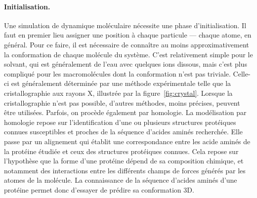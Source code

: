 	\paragraph{Initialisation.}
	Une simulation de dynamique moléculaire nécessite une phase d'initialisation. Il faut en premier lieu assigner une position à chaque particule --- chaque atome, en général. Pour ce faire, il est nécessaire de connaître au moins approximativement la conformation de chaque molécule du système. C'est relativement simple pour le solvant, qui est généralement de l'eau avec quelques ions dissous, mais c'est plus compliqué pour les macromolécules dont la conformation n'est pas triviale. Celle-ci est généralement déterminée par une méthode expérimentale telle que la cristallographie aux rayons X, illustrée par la figure~\ref{fig:crystal}. Lorsque la cristallographie n'est pas possible, d'autres méthodes, moins précises, peuvent être utilisées. Parfois, on procède également par homologie. La modélisation par homologie repose sur l'identification d'une ou plusieurs structures protéiques connues susceptibles et proches de la séquence d'acides aminés recherchée. Elle passe par un alignement qui établit une correspondance entre les acide aminés de la protéine étudiée et ceux des structures protéiques connues. Cela repose sur l'hypothèse que la forme d'une protéine dépend de sa composition chimique, et notamment des interactions entre les différents champs de forces générés par les atomes de la molécule. La connaissance de la séquence d'acides aminés d'une protéine permet donc d'essayer de prédire sa conformation 3D.
	
